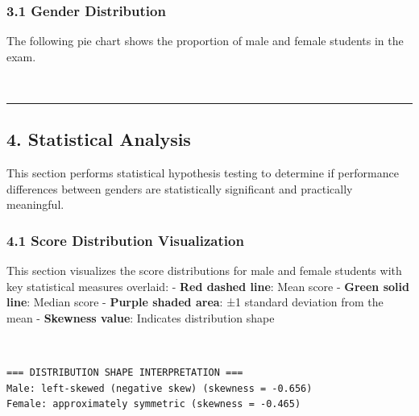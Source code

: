 \documentclass[11pt]{article}
\begin{document}
    \subsubsection{3.1 Gender Distribution}\label{gender-distribution}

The following pie chart shows the proportion of male and female students
in the exam.

    \begin{center}
    \end{center}
    { \hspace*{\fill} \\}
    
    \begin{center}\rule{0.5\linewidth}{0.5pt}\end{center}

\subsection{4. Statistical Analysis}\label{statistical-analysis}

This section performs statistical hypothesis testing to determine if
performance differences between genders are statistically significant
and practically meaningful.

    \subsubsection{4.1 Score Distribution
Visualization}\label{score-distribution-visualization}

This section visualizes the score distributions for male and female
students with key statistical measures overlaid: - \textbf{Red dashed
line}: Mean score - \textbf{Green solid line}: Median score -
\textbf{Purple shaded area}: ±1 standard deviation from the mean -
\textbf{Skewness value}: Indicates distribution shape

    \begin{center}
    \end{center}
    { \hspace*{\fill} \\}
    
    \begin{Verbatim}[commandchars=\\\{\}]
=== DISTRIBUTION SHAPE INTERPRETATION ===
Male: left-skewed (negative skew) (skewness = -0.656)
Female: approximately symmetric (skewness = -0.465)
    \end{Verbatim}
\end{document}
